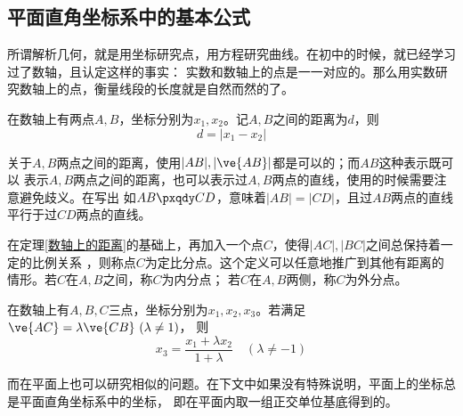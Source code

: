 \subsection{平面直角坐标系中的基本公式}
所谓解析几何，就是用坐标研究点，用方程研究曲线。在初中的时候，就已经学习过了数轴，且认定这样的事实：
实数和数轴上的点是一一对应的。那么用实数研究数轴上的点，衡量线段的长度就是自然而然的了。
\vspace*{-5pt}
\begin{figure}[h]
    \centering
\end{figure}
\vspace*{-5pt}
\begin{theorem}\label{数轴上的距离}在数轴上有两点\(A,B\)，坐标分别为\(x_1,x_2\)。记\(A,B\)之间的距离为\(d\)，则
    \begin{equation}
        d=|x_1-x_2|
    \end{equation}
\end{theorem}

关于\(A,B\)两点之间的距离，使用\(|AB|,|\ve{AB}|\)都是可以的；而\(AB\)这种表示既可以
表示\(A,B\)两点之间的距离，也可以表示过\(A,B\)两点的直线，使用的时候需要注意避免歧义。在写出
如\(AB\pxqdy CD\)，意味着\(|AB|=|CD|\)，且过\(AB\)两点的直线平行于过\(CD\)两点的直线。

\begin{definition}
    在定理\ref{数轴上的距离}的基础上，再加入一个点\(C\)，使得\(|AC|,|BC|\)之间总保持着一定的比例关系
，则称点\(C\)为定比分点。这个定义可以任意地推广到其他有距离的情形。若\(C\)在\(A,B\)之间，称\(C\)为内分点；
若\(C\)在\(A,B\)两侧，称\(C\)为外分点。
\end{definition}
\begin{theorem}
    在数轴上有\(A,B,C\)三点，坐标分别为\(x_1,x_2,x_3\)。若满足\(\ve{AC}=\lambda\ve{CB} \ (\lambda\neq 1)\)，
    则\begin{equation}
        x_3=\frac{x_{1}+\lambda x_{2}}{1+\lambda} \quad(\lambda \neq-1)
    \end{equation}
\end{theorem}

而在平面上也可以研究相似的问题。在下文中如果没有特殊说明，平面上的坐标总是平面直角坐标系中的坐标，
即在平面内取一组正交单位基底得到的。

